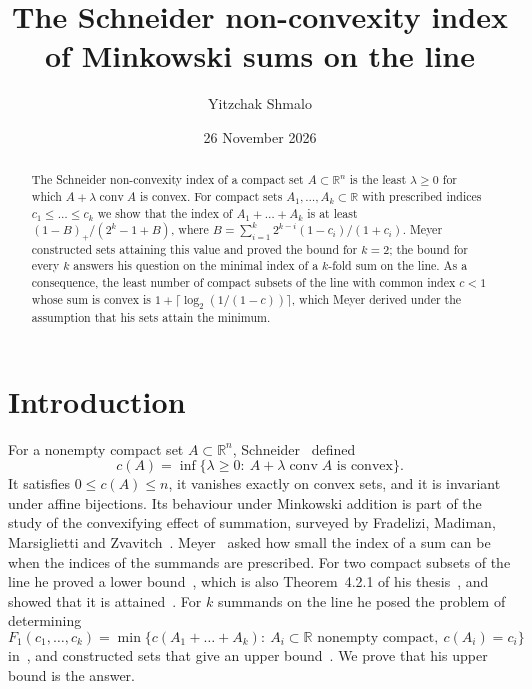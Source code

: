 \documentclass[11pt]{amsart}
\theoremstyle{remark}
\DeclareMathOperator{\conv}{conv}
\begin{document}
\title[The Schneider index of Minkowski sums on the line]{The Schneider non-convexity index of Minkowski sums on the
line}
\author{Yitzchak Shmalo}
\date{26 November 2026}
\address{Einstein Institute of Mathematics, The Hebrew University of Jerusalem, Jerusalem, Israel}

\begin{abstract}
The Schneider non-convexity index of a compact set $A\subset\mathbb{R}^n$ is the least $\lambda\ge0$ for which
$A+\lambda\conv A$ is convex. For compact sets $A_1,\dots,A_k\subset\mathbb{R}$ with prescribed indices
$c_1\le\dots\le c_k$ we show that the index of $A_1+\dots+A_k$ is at least $(1-B)_+/(2^k-1+B)$, where
$B=\sum_{i=1}^k 2^{k-i}(1-c_i)/(1+c_i)$. Meyer constructed sets attaining this value and proved the bound for $k=2$;
the bound for every $k$ answers his question on the minimal index of a $k$-fold sum on the line. As a consequence, the
least number of compact subsets of the line with common index $c<1$ whose sum is convex is
$1+\lceil\log_2(1/(1-c))\rceil$, which Meyer derived under the assumption that his sets attain the minimum.
\end{abstract}

\maketitle

\section{Introduction}

For a nonempty compact set $A\subset\mathbb{R}^n$, Schneider~\cite{Sch} defined
\[
  c(A)=\inf\{\lambda\ge0:\ A+\lambda\conv A \text{ is convex}\}.
\]
It satisfies $0\le c(A)\le n$, it vanishes exactly on convex sets, and it is invariant under affine bijections. Its
behaviour under Minkowski addition is part of the study of the convexifying effect of summation, surveyed by
Fradelizi, Madiman, Marsiglietti and Zvavitch~\cite{FMMZ}. Meyer~\cite{MeyerArx,MeyerJIA} asked how small the index
of a sum can be when the indices of the summands are prescribed. For two compact subsets of the line he proved a lower
bound~\cite[Theorem~1.2]{MeyerJIA}, which is also Theorem~4.2.1 of his thesis~\cite{MeyerThesis}, and showed that it is
attained~\cite[Corollary~1.2]{MeyerJIA}. For $k$ summands on the line he posed the problem of determining
\[
  F_1(c_1,\dots,c_k)=\min\{c(A_1+\dots+A_k):\ A_i\subset\mathbb{R}\text{ nonempty compact},\ c(A_i)=c_i\}
\]
in~\cite[Problem~2.2]{MeyerArx}, and constructed sets that give an upper bound~\cite[Proposition~2.1]{MeyerArx}. We
prove that his upper bound is the answer.
\end{document}
